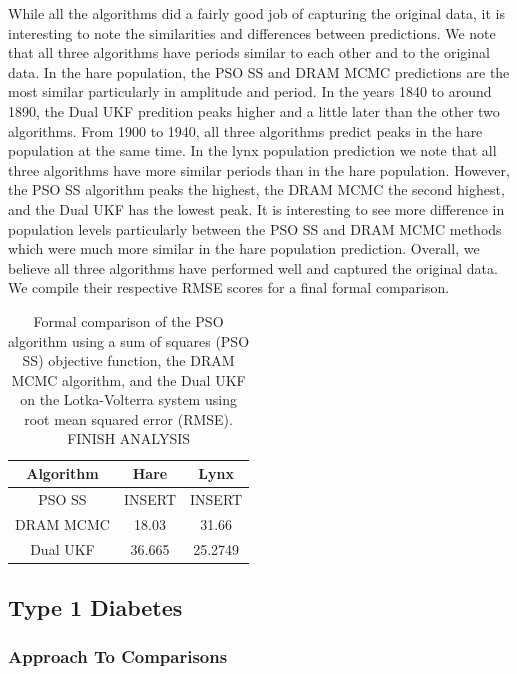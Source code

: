 While all the algorithms did a fairly good job of capturing the original data, it is interesting to note the similarities and differences between predictions. We note that all three algorithms have periods similar to each other and to the original data. In the hare population, the PSO SS and DRAM MCMC predictions are the most similar particularly in amplitude and period. In the years 1840 to around 1890, the Dual UKF predition peaks higher and a little later than the other two algorithms. From 1900 to 1940, all three algorithms predict peaks in the hare population at the same time. In the lynx population prediction we note that all three algorithms have more similar periods than in the hare population. However, the PSO SS algorithm peaks the highest, the DRAM MCMC the second highest, and the Dual UKF has the lowest peak. It is interesting to see more difference in population levels particularly between the PSO SS and DRAM MCMC methods which were much more similar in the hare population prediction. Overall, we believe all three algorithms have performed well and captured the original data. We compile their respective RMSE scores for a final formal comparison.
\begin{table}[H]
\centering
        \begin{tabular}{c | c c}
            \cline{1-3}
            \textbf{Algorithm}  &\textbf{Hare} & \textbf{Lynx}\\
            \hline
            PSO SS & INSERT & INSERT \\
            DRAM MCMC & 18.03 & 31.66\\
            Dual UKF & 36.665 & 25.2749\\\hline
            \hline
        \end{tabular}
    \caption{Formal comparison of the PSO algorithm using a sum of squares (PSO SS) objective function, the DRAM MCMC algorithm, and the Dual UKF on the Lotka-Volterra system using root mean squared error (RMSE). FINISH ANALYSIS}
    \label{tab:LVdrampsoukf}
\end{table}


\subsection{Type 1 Diabetes}

\subsubsection{Approach To Comparisons}

